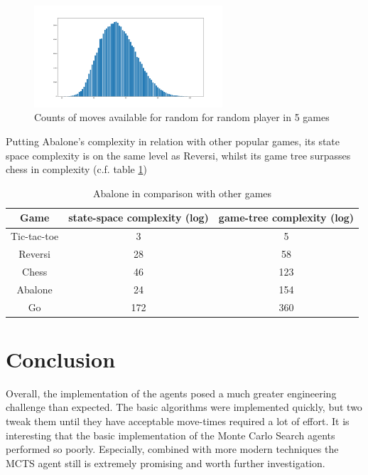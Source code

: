 \documentclass{../lib/llncs}
\begin{document}
\begin{figure}
	\centering
	\includegraphics[width=7cm, keepaspectratio]{distribution_of_moves.png}
	\caption{Counts of moves available for random for random player in 5 games}
\end{figure}

Putting Abalone's complexity in relation with other popular games, its state space complexity is on the same level as Reversi, whilst its game tree surpasses chess in complexity (c.f. table \ref{complexity_table})

\begin{table}
	\begin{center}
		\begin{tabular}{ | c | c | c | }
			\hline
			Game        & state-space complexity (log) & game-tree complexity (log) \\
			\hline
			Tic-tac-toe & 3                            & 5                          \\
			\hline
			Reversi     & 28                           & 58                         \\
			\hline
			Chess       & 46                           & 123                        \\
			\hline
			Abalone     & 24                           & 154                        \\
			\hline
			Go          & 172                          & 360                        \\
			\hline
		\end{tabular}
	\end{center}
	\caption{Abalone in comparison with other games \cite{chorus_implementing_2009}}
	\label{complexity_table}
\end{table}



\section{Conclusion}
Overall, the implementation of the agents posed a much greater engineering challenge than expected. The basic algorithms were implemented quickly, but two tweak them until they have acceptable move-times required a lot of effort. It is interesting that the basic implementation of the Monte Carlo Search agents performed so poorly. Especially, combined with more modern techniques the MCTS agent still is extremely promising and worth further investigation.



\end{document}

